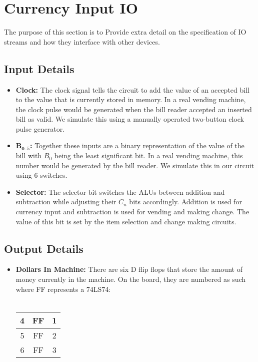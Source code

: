 \section{Currency Input IO}
The purpose of this section is to Provide extra detail on the specification of IO streams and how they interface with other devices. 

\subsection{Input Details}
\label{selector}
\begin{itemize}
\item \textbf{Clock:} The clock signal tells the circuit to add the value of an accepted bill to the value that is currently stored in memory. In a real vending machine, the clock pulse would be generated when the bill reader accepted an inserted bill as valid. We simulate this using a manually operated two-button clock pulse generator. 
\item $\mathbf{B_{0..5}}$\textbf{:} Together these inputs are a binary representation of the value of the bill with $B_0$ being the least significant bit. In a real vending machine, this number would be generated by the bill reader. We simulate this in our circuit using 6 switches. 
\item \textbf{Selector:} The selector bit switches the ALUs between addition and subtraction while adjusting their $C_n$ bits accordingly. Addition is used for currency input and subtraction is used for vending and making change. The value of this bit is set by the item selection and change making circuits. 
\end{itemize}

\subsection{Output Details}
\label{dollars-in-machine}
\begin{itemize}
\item \textbf{Dollars In Machine:} There are six D flip flops that store the amount of money currently in the machine. On the board, they are numbered as such where FF represents a 74LS74: \\\\
\begin{tabular}{|c|c|c|}
\hline 
4 & FF & 1 \\ 
\hline 
5 & FF & 2 \\ 
\hline 
6 & FF & 3 \\ 
\hline 
\end{tabular} 
\end{itemize}
